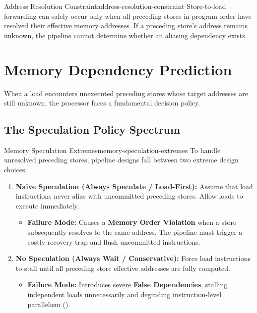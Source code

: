 \begin{observation}{Address Resolution Constraint}{address-resolution-constraint}
Store-to-load forwarding can safely occur only when all preceding stores in program order have resolved their effective memory addresses. If a preceding store's address remains unknown, the pipeline cannot determine whether an aliasing dependency exists.
\end{observation}

\section{Memory Dependency Prediction}
\label{sec:memory_dependency_prediction}

When a load encounters unexecuted preceding stores whose target addresses are still unknown, the processor faces a fundamental decision policy.

\subsection{The Speculation Policy Spectrum}

\begin{concept}{Memory Speculation Extremes}{memory-speculation-extremes}
To handle unresolved preceding stores, pipeline designs fall between two extreme design choices:
\begin{enumerate}
    \item \textbf{Naive Speculation (Always Speculate / Load-First):} Assume that load instructions never alias with uncommitted preceding stores. Allow loads to execute immediately.
    \begin{itemize}
        \item \textbf{Failure Mode:} Causes a \textbf{Memory Order Violation} when a store subsequently resolves to the same address. The pipeline must trigger a costly recovery trap and flush uncommitted instructions.
    \end{itemize}
    \item \textbf{No Speculation (Always Wait / Conservative):} Force load instructions to stall until all preceding store effective addresses are fully computed.
    \begin{itemize}
        \item \textbf{Failure Mode:} Introduces severe \textbf{False Dependencies}, stalling independent loads unnecessarily and degrading instruction-level parallelism ().
    \end{itemize}
\end{enumerate}
\end{concept}


